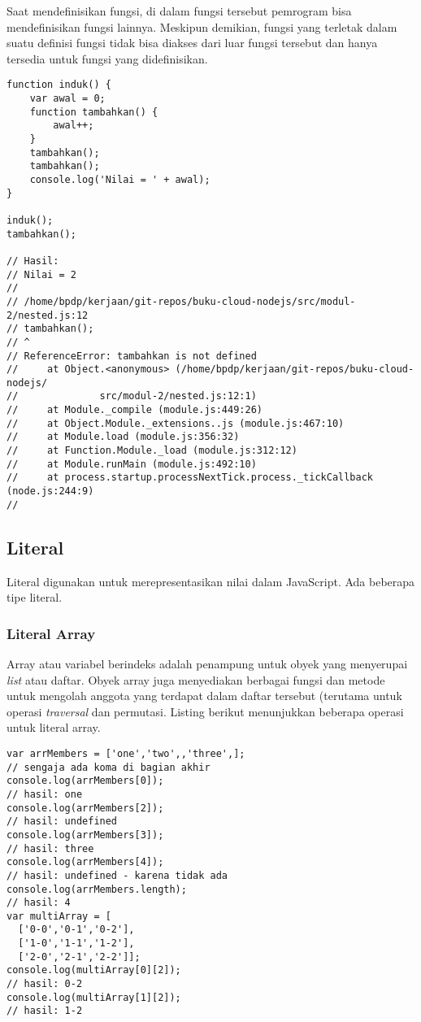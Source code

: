 Saat mendefinisikan fungsi, di dalam fungsi tersebut pemrogram bisa mendefinisikan fungsi lainnya. Meskipun demikian, fungsi yang terletak dalam suatu definisi fungsi tidak bisa diakses dari luar fungsi tersebut dan hanya tersedia untuk fungsi yang didefinisikan.

\lstset{language=JavaScript,caption=Fungsi di dalam Fungsi}
\begin{lstlisting}
function induk() {
	var awal = 0;
	function tambahkan() {
		awal++;
	}
	tambahkan();
	tambahkan();
	console.log('Nilai = ' + awal);
}

induk();
tambahkan();

// Hasil:
// Nilai = 2
//
// /home/bpdp/kerjaan/git-repos/buku-cloud-nodejs/src/modul-2/nested.js:12
// tambahkan();
// ^
// ReferenceError: tambahkan is not defined
//     at Object.<anonymous> (/home/bpdp/kerjaan/git-repos/buku-cloud-nodejs/
//				src/modul-2/nested.js:12:1)
//     at Module._compile (module.js:449:26)
//     at Object.Module._extensions..js (module.js:467:10)
//     at Module.load (module.js:356:32)
//     at Function.Module._load (module.js:312:12)
//     at Module.runMain (module.js:492:10)
//     at process.startup.processNextTick.process._tickCallback (node.js:244:9)
//
\end{lstlisting}

\subsection{Literal}

Literal digunakan untuk merepresentasikan nilai dalam JavaScript. Ada beberapa tipe literal.

\subsubsection{Literal Array}

Array atau variabel berindeks adalah penampung untuk obyek yang menyerupai \textit{list} atau daftar. Obyek array juga menyediakan berbagai fungsi dan metode untuk mengolah anggota yang terdapat dalam daftar tersebut (terutama untuk operasi \textit{traversal} dan permutasi. Listing berikut menunjukkan beberapa operasi untuk literal array.

\lstset{language=JavaScript,caption=Array di JavaScript}
\begin{lstlisting}
var arrMembers = ['one','two',,'three',];
// sengaja ada koma di bagian akhir
console.log(arrMembers[0]);
// hasil: one
console.log(arrMembers[2]);
// hasil: undefined
console.log(arrMembers[3]);
// hasil: three
console.log(arrMembers[4]);
// hasil: undefined - karena tidak ada
console.log(arrMembers.length);
// hasil: 4
var multiArray = [
  ['0-0','0-1','0-2'],
  ['1-0','1-1','1-2'],
  ['2-0','2-1','2-2']];
console.log(multiArray[0][2]);
// hasil: 0-2
console.log(multiArray[1][2]);
// hasil: 1-2
\end{lstlisting}

